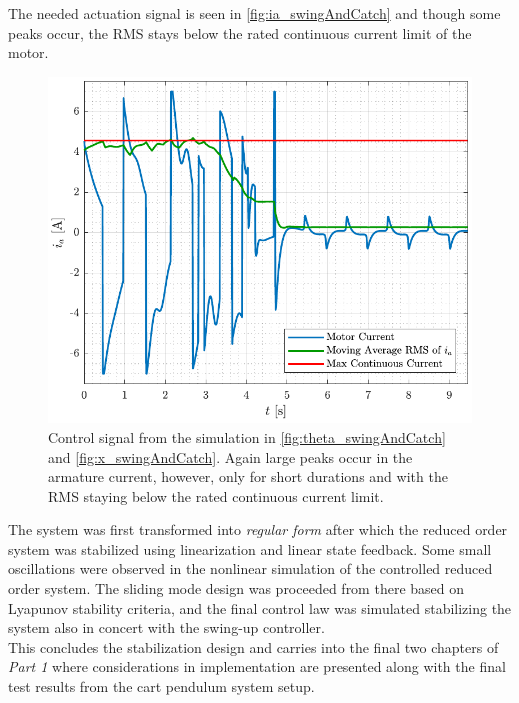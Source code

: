 %
The needed actuation signal is seen in \autoref{fig:ia_swingAndCatch} and though some peaks occur, the RMS stays below the rated continuous current limit of the motor.%
%
\begin{figure}[H]
  \includegraphics[width=.42\textwidth]{figures/ia_swingAndCatch}
  \caption{Control signal from the simulation in \autoref{fig:theta_swingAndCatch} and \ref{fig:x_swingAndCatch}. Again large peaks occur in the armature current, however, only for short durations and with the RMS staying below the rated continuous current limit.}
  \label{fig:ia_swingAndCatch}
\end{figure}
%
The system was first transformed into \textit{regular form} after which the reduced order system was stabilized using linearization and linear state feedback. Some small oscillations were observed in the nonlinear simulation of the controlled reduced order system. The sliding mode design was proceeded from there based on Lyapunov stability criteria, and the final control law was simulated stabilizing the system also in concert with the swing-up controller.\\
This concludes the stabilization design and carries into the final two chapters of \textit{Part 1} where considerations in implementation are presented along with the final test results from the cart pendulum system setup.
